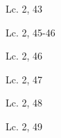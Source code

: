 \documentclass[a4paper,11pt,sans]{article}
\begin{document}
      \begin{multicols}{2}

      \columnbreak
          
      \end{multicols}
      \begin{center}
        Lc. 2, 43        
      \end{center}
      
      \begin{multicols}{2}

      \columnbreak
          
      \end{multicols}
      \begin{center}
        Lc. 2, 45-46       
      \end{center}
      
      \begin{multicols}{2}

      \columnbreak
          
      \end{multicols}
      \begin{center}
        Lc. 2, 46       
      \end{center}
      
      \begin{multicols}{2}

      \columnbreak
          
      \end{multicols}
      \begin{center}
        Lc. 2, 47     
      \end{center}

      \begin{multicols}{2}

      \columnbreak
          
      \end{multicols}
      \begin{center}
        Lc. 2, 48     
      \end{center}
      
      \begin{multicols}{2}

      \columnbreak
          
      \end{multicols}
      \begin{center}
        Lc. 2, 49        
      \end{center}
      
\end{document}
